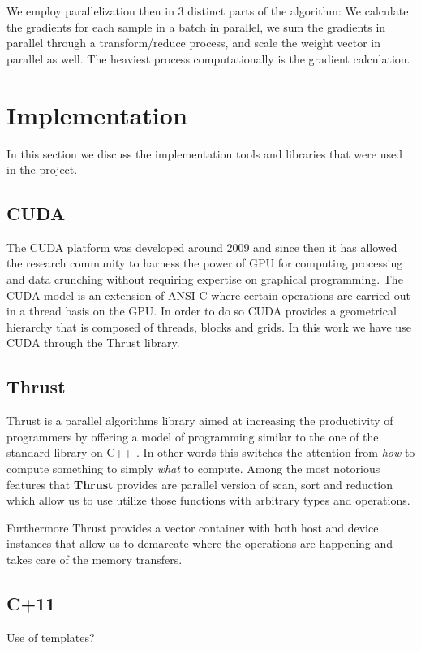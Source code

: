 \documentclass[11pt,a4paper]{article}
\begin{document}
We employ parallelization then in 3 distinct parts of the algorithm: We calculate the gradients for
each sample in a batch in parallel, we sum the gradients in parallel through a transform/reduce
process, and scale the weight vector in parallel as well. The heaviest process computationally is
the gradient calculation.


\section{Implementation}
In this section we discuss the implementation tools and libraries that were used in the project.

\subsection{CUDA}
The CUDA platform was developed around 2009 \citep{nickolls2008scalable} and since then it has
allowed the research community to harness the power of GPU for computing processing and data
crunching without requiring expertise on graphical programming. The CUDA model is an extension of
ANSI C where certain operations are carried out in a thread basis on the GPU. In order to do so
CUDA provides a geometrical hierarchy that is composed of threads, blocks and grids. In this work
we have use CUDA through the Thrust library.

\subsection{Thrust}
Thrust is a parallel algorithms library aimed at increasing the productivity of programmers by
offering a model of programming similar to the one of the standard library on C++
\citep{bell2012thrust}. In other words this switches the attention from \textit{how} to compute
something to simply \textit{what} to compute. Among the most notorious features that
\textbf{Thrust} provides are parallel version of scan, sort and reduction which allow us to use
utilize those functions with arbitrary types and operations.

Furthermore Thrust provides a vector container with both host and device instances that allow us to demarcate where the operations are happening and takes care of the memory transfers.


\subsection{C+11}
Use of templates?
\end{document}
